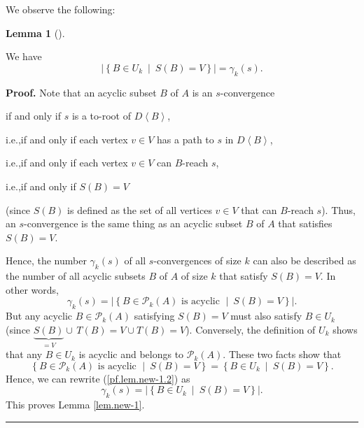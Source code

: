 \documentclass[numbers=enddot,12pt,final,onecolumn,notitlepage]{scrartcl}%
\theoremstyle{definition}
\newtheorem{lem}[theo]{Lemma}
\newenvironment{lemma}[1][]
{\begin{lem}[#1]\begin{leftbar}}
{\end{leftbar}\end{lem}}
\newenvironment{proof}[1][Proof]{\noindent\textbf{#1.} }{\ \rule{0.5em}{0.5em}}
\theoremstyle{plainsl}
\begin{document}
We observe the following:

\begin{lemma}
\label{lem.new-1}We have%
\[
\left\vert \left\{  B\in U_{k}\ \mid\ S\left(  B\right)  =V\right\}
\right\vert =\gamma_{k}\left(  s\right)  .
\]

\end{lemma}

\begin{proof}
Note that an acyclic subset $B$ of $A$ is an $s$-convergence

\qquad\qquad if and only if $s$ is a to-root of $D\left\langle B\right\rangle
$,

\qquad i.e.,\quad if and only if each vertex $v\in V$ has a path to $s$ in
$D\left\langle B\right\rangle $,

\qquad i.e.,\quad if and only if each vertex $v\in V$ can $B$-reach $s$,

\qquad i.e.,\quad if and only if $S\left(  B\right)  =V$

\noindent(since $S\left(  B\right)  $ is defined as the set of all vertices
$v\in V$ that can $B$-reach $s$). Thus, an $s$-convergence is the same thing
as an acyclic subset $B$ of $A$ that satisfies $S\left(  B\right)  =V$.

Hence, the number $\gamma_{k}\left(  s\right)  $ of all $s$-convergences of
size $k$ can also be described as the number of all acyclic subsets $B$ of $A$
of size $k$ that satisfy $S\left(  B\right)  =V$. In other words,%
\begin{equation}
\gamma_{k}\left(  s\right)  =\left\vert \left\{  B\in\mathcal{P}_{k}\left(
A\right)  \text{ is acyclic }\mid\ S\left(  B\right)  =V\right\}  \right\vert
.\label{pf.lem.new-1.2}%
\end{equation}
But any acyclic $B\in\mathcal{P}_{k}\left(  A\right)  $ satisfying $S\left(
B\right)  =V$ must also satisfy $B\in U_{k}$ (since $\underbrace{S\left(
B\right)  }_{=V}\cup\,T\left(  B\right)  =V\cup T\left(  B\right)  =V$).
Conversely, the definition of $U_{k}$ shows that any $B\in U_{k}$ is acyclic
and belongs to $\mathcal{P}_{k}\left(  A\right)  $. These two facts show that%
\[
\left\{  B\in\mathcal{P}_{k}\left(  A\right)  \text{ is acyclic }%
\mid\ S\left(  B\right)  =V\right\}  =\left\{  B\in U_{k}\ \mid\ S\left(
B\right)  =V\right\}  .
\]
Hence, we can rewrite (\ref{pf.lem.new-1.2}) as
\[
\gamma_{k}\left(  s\right)  =\left\vert \left\{  B\in U_{k}\ \mid\ S\left(
B\right)  =V\right\}  \right\vert .
\]
This proves Lemma \ref{lem.new-1}.
\end{proof}
\end{document}
